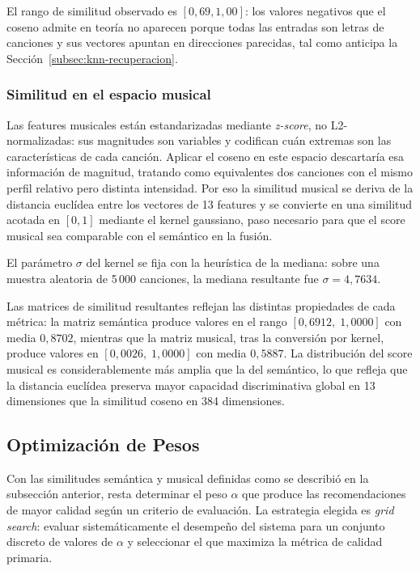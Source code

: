 El rango de similitud observado es $[0{,}69, 1{,}00]$: los valores negativos que el coseno admite en teoría no aparecen porque todas las entradas son letras de canciones y sus vectores apuntan en direcciones parecidas, tal como anticipa la Sección~\ref{subsec:knn-recuperacion}.

\subsubsection*{Similitud en el espacio musical}

Las features musicales están estandarizadas mediante \textit{z-score}, no L2-normalizadas: sus magnitudes son variables y codifican cuán extremas son las características de cada canción. Aplicar el coseno en este espacio descartaría esa información de magnitud, tratando como equivalentes dos canciones con el mismo perfil relativo pero distinta intensidad. Por eso la similitud musical se deriva de la distancia euclídea entre los vectores de 13 features y se convierte en una similitud acotada en $[0, 1]$ mediante el kernel gaussiano, paso necesario para que el score musical sea comparable con el semántico en la fusión.

El parámetro $\sigma$ del kernel se fija con la heurística de la mediana: sobre una muestra aleatoria de 5\,000 canciones, la mediana resultante fue $\sigma = 4{,}7634$.

Las matrices de similitud resultantes reflejan las distintas propiedades de cada métrica: la matriz semántica produce valores en el rango $[0{,}6912,\; 1{,}0000]$ con media $0{,}8702$, mientras que la matriz musical, tras la conversión por kernel, produce valores en $[0{,}0026,\; 1{,}0000]$ con media $0{,}5887$. La distribución del score musical es considerablemente más amplia que la del semántico, lo que refleja que la distancia euclídea preserva mayor capacidad discriminativa global en 13 dimensiones que la similitud coseno en 384 dimensiones.

\subsection{Optimización de Pesos}
\label{subsec:optimizacion-pesos}

Con las similitudes semántica y musical definidas como se describió en la subsección anterior, resta determinar el peso $\alpha$ que produce las recomendaciones de mayor calidad según un criterio de evaluación. La estrategia elegida es \textit{grid search}: evaluar sistemáticamente el desempeño del sistema para un conjunto discreto de valores de $\alpha$ y seleccionar el que maximiza la métrica de calidad primaria.

